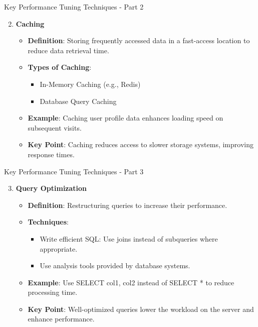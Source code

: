 \documentclass[aspectratio=169]{beamer}
\begin{document}
\begin{frame}[fragile]{Key Performance Tuning Techniques - Part 2}
    \begin{enumerate}
        \setcounter{enumi}{1}
        \item \textbf{Caching}
            \begin{itemize}
                \item \textbf{Definition}: Storing frequently accessed data in a fast-access location to reduce data retrieval time.
                \item \textbf{Types of Caching}:
                    \begin{itemize}
                        \item In-Memory Caching (e.g., Redis)
                        \item Database Query Caching
                    \end{itemize}
                \item \textbf{Example}: Caching user profile data enhances loading speed on subsequent visits.
                \item \textbf{Key Point}: Caching reduces access to slower storage systems, improving response times.
            \end{itemize}
    \end{enumerate}
\end{frame}

\begin{frame}[fragile]{Key Performance Tuning Techniques - Part 3}
    \begin{enumerate}
        \setcounter{enumi}{2}
        \item \textbf{Query Optimization}
            \begin{itemize}
                \item \textbf{Definition}: Restructuring queries to increase their performance.
                \item \textbf{Techniques}:
                    \begin{itemize}
                        \item Write efficient SQL: Use joins instead of subqueries where appropriate.
                        \item Use analysis tools provided by database systems.
                    \end{itemize}
                \item \textbf{Example}: Use SELECT col1, col2 instead of SELECT * to reduce processing time.
                \item \textbf{Key Point}: Well-optimized queries lower the workload on the server and enhance performance.
            \end{itemize}
    \end{enumerate}
\end{frame}
\end{document}
